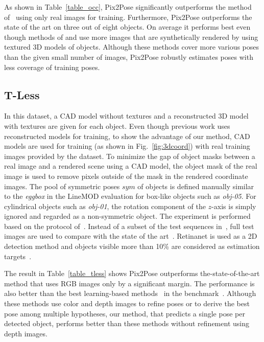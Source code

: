 \documentclass[10pt,twocolumn,letterpaper]{article}
\begin{document}
As shown in Table~\ref{table_occ}, Pix2Pose significantly outperforms the method of~\cite{Tekin_2018_CVPR} using only real images for training. Furthermore, Pix2Pose outperforms the state of the art on three out of eight objects. On average it performs best even though methods of \cite{Oberweger_2018_ECCV_heatmap} and \cite{xiang2017posecnn} use more images that are synthetically rendered by using textured 3D models of objects. Although these methods cover more various poses than the given small number of images, Pix2Pose robustly estimates poses with less coverage of training poses.


\subsection{T-Less}
In this dataset, a CAD model without textures and a reconstructed 3D model with textures are given for each object. Even though previous work uses reconstructed models for training, to show the advantage of our method, CAD models are used for training (as shown in Fig.~\ref{fig:3dcoord}) with real training images provided by the dataset. To minimize the gap of object masks between a real image and a rendered scene using a CAD model, the object mask of the real image is used to remove pixels outside of the mask in the rendered coordinate images. The pool of symmetric poses $sym$ of objects is defined manually similar to the \textit{eggbox} in the LineMOD evaluation for box-like objects such as \textit{obj-05}. For cylindrical objects such as \textit{obj-01}, the rotation component of the $z$-axis is simply ignored and regarded as a non-symmetric object. The experiment is performed based on the protocol of~\cite{Hodan_2018_ECCV_bop}. Instead of a subset of the test sequences in~\cite{Hodan_2018_ECCV_bop}, full test images are used to compare with the state of the art~\cite{Sundermeyer_2018_ECCV_implicit}. Retinanet is used as a 2D detection method and objects visible more than 10\% are considered as estimation targets~\cite{Hodan_2018_ECCV_bop,Sundermeyer_2018_ECCV_implicit}. 

The result in Table~\ref{table_tless} shows Pix2Pose outperforms the-state-of-the-art method that uses RGB images only by a significant margin. The performance is also better than the best learning-based methods~\cite{cnn_pose:brachmann2016uncertainty_only_rgb, kehl2016deep} in the benchmark~\cite{Hodan_2018_ECCV_bop}. Although these methods use color and depth images to refine poses or to derive the best pose among multiple hypotheses, our method, that predicts a single pose per detected object, performs better than these methods without refinement using depth images. 
\end{document}
